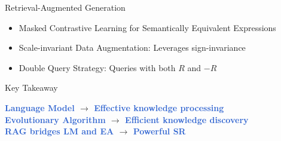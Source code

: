 \documentclass[final]{beamer}
\newcommand{\hlgreen}[1]{\textcolor{highlight}{#1}}
\newlength{\sepwid}
\newlength{\onecolwid}
\begin{document}
\begin{frame}[t]
\begin{columns}[t]
\begin{column}{\onecolwid}
\begin{block}{Retrieval-Augmented Generation}
                    \begin{itemize}
                        \item Masked Contrastive Learning for Semantically Equivalent Expressions
                        \item Scale-invariant Data Augmentation: Leverages sign-invariance
                        \item Double Query Strategy: Queries with both $R$ and $-R$
                    \end{itemize}
                \end{block}
                \vspace{-0.3cm}
                \begin{alertblock}{Key Takeaway}
                    \begin{center}
                        \textbf{\hlgreen{Language Model} $\rightarrow$ \hlgreen{Effective knowledge processing}}\\
                        \textbf{\hlgreen{Evolutionary Algorithm} $\rightarrow$ \hlgreen{Efficient knowledge discovery}}\\
                        \textbf{\hlgreen{RAG bridges LM and EA} $\rightarrow$ \hlgreen{Powerful SR}}
                    \end{center}
                \end{alertblock}
            \end{column} %

            \begin{column}{\sepwid}\end{column} %

            \begin{column}{\onecolwid} %




\end{column}
\end{columns}
\end{frame}
\end{document}
